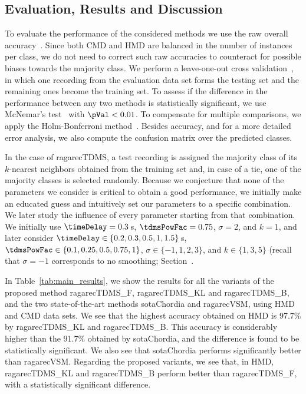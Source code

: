 \subsection{Evaluation, Results and Discussion}
\label{sec:tdms_eval_results}

To evaluate the performance of the considered methods we use the raw overall accuracy~\cite{Mitchell97BOOK}. Since both CMD and HMD are balanced in the number of instances per class, we do not need to correct such raw accuracies to counteract for possible biases towards the majority class. We perform a leave-one-out cross validation~\cite{Mitchell97BOOK}, in which one recording from the evaluation data set forms the testing set and the remaining ones become the training set. To assess if the difference in the performance between any two methods is statistically significant, we use McNemar's test~\cite{mcnemar1947note} with $\pVal < 0.01$. To compensate for multiple comparisons, we apply the Holm-Bonferroni method~\cite{holm1979simple}. Besides accuracy, and for a more detailed error analysis, we also compute the confusion matrix over the predicted classes.

In the case of \acrshort{ragarecTDMS}, a test recording is assigned the majority class of its $k$-nearest neighbors obtained from the training set and, in case of a tie, one of the majority classes is selected randomly. Because we conjecture that none of the parameters we consider is critical to obtain a good performance, we initially make an educated guess and intuitively set our parameters to a specific combination. We later study the influence of every parameter starting from that combination. We initially use $\timeDelay=0.3$\,s, $\tdmsPowFac=0.75$, $\sigma=2$, and $k=1$, and later consider $\timeDelay\in\lbrace 0.2, 0.3, 0.5, 1, 1.5\rbrace$\,s, $\tdmsPowFac\in\lbrace 0.1, 0.25, 0.5, 0.75, 1 \rbrace$, $\sigma\in\lbrace -1, 1, 2, 3\rbrace$, and $k\in\lbrace 1,3,5\rbrace$ (recall that $\sigma=-1$ corresponds to no smoothing; Section~.


In Table~\ref{tab:main_results}, we show the results for all the variants of the proposed method \acrshort{ragarecTDMS_F}, \acrshort{ragarecTDMS_KL} and \acrshort{ragarecTDMS_B}, and the two state-of-the-art methods \acrshort{sotaChordia} and \acrshort{ragarecVSM}, using HMD and CMD data sets. We see that the highest accuracy obtained on HMD is 97.7\% by \acrshort{ragarecTDMS_KL} and \acrshort{ragarecTDMS_B}. This accuracy is considerably higher than the 91.7\% obtained by \acrshort{sotaChordia}, and the difference is found to be statistically significant. We also see that \acrshort{sotaChordia} performs significantly better than \acrshort{ragarecVSM}. Regarding the proposed variants, we see that, in HMD, \acrshort{ragarecTDMS_KL} and \acrshort{ragarecTDMS_B} perform better than \acrshort{ragarecTDMS_F}, with a statistically significant difference. 

